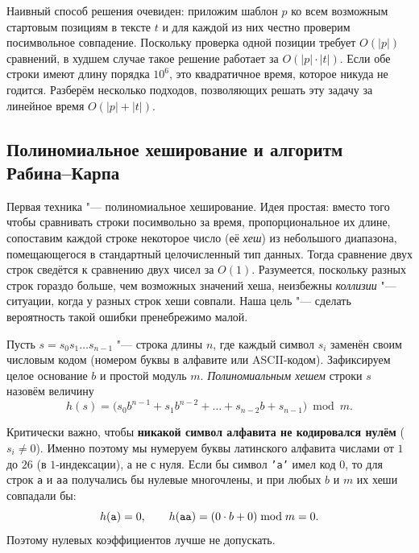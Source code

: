 Наивный способ решения очевиден: приложим шаблон $p$ ко всем возможным стартовым позициям в тексте $t$ и для каждой из них честно проверим посимвольное совпадение. Поскольку проверка одной позиции требует $O(|p|)$ сравнений, в худшем случае такое решение работает за $O(|p| \cdot |t|)$. Если обе строки имеют длину порядка $10^6$, это квадратичное время, которое никуда не годится. Разберём несколько подходов, позволяющих решать эту задачу за линейное время $O(|p| + |t|)$.

\subsection{Полиномиальное хеширование и алгоритм Рабина--Карпа}

Первая техника "--- полиномиальное хеширование. Идея простая: вместо того чтобы сравнивать строки посимвольно за время, пропорциональное их длине, сопоставим каждой строке некоторое число (её \textit{хеш}) из небольшого диапазона, помещающегося в стандартный целочисленный тип данных. Тогда сравнение двух строк сведётся к сравнению двух чисел за $O(1)$. Разумеется, поскольку разных строк гораздо больше, чем возможных значений хеша, неизбежны \textit{коллизии} "--- ситуации, когда у разных строк хеши совпали. Наша цель "--- сделать вероятность такой ошибки пренебрежимо малой.

\begin{definition}
    Пусть $s = s_0 s_1 \dots s_{n-1}$ "--- строка длины $n$, где каждый символ $s_i$ заменён своим числовым кодом (номером буквы в алфавите или ASCII-кодом). Зафиксируем целое основание $b$ и простой модуль $m$. \textit{Полиномиальным хешем} строки $s$ назовём величину
    \begin{equation}\label{eq:poly_hash}
        h(s) = \bigl(s_0 b^{n-1} + s_1 b^{n-2} + \dots + s_{n-2} b + s_{n-1}\bigr) \bmod m.
    \end{equation}
\end{definition}

\begin{note}
    Критически важно, чтобы \textbf{никакой символ алфавита не кодировался нулём} ($s_i \ne 0$). Именно поэтому мы нумеруем буквы латинского алфавита числами от $1$ до $26$ (в $1$-индексации), а не с нуля. Если бы символ \texttt{'a'} имел код $0$, то для строк \texttt{a} и \texttt{aa} получались бы нулевые многочлены, и при любых $b$ и $m$ их хеши совпадали бы:
    \[
        h(\text{\texttt{a}}) = 0, \qquad h(\text{\texttt{aa}}) = (0 \cdot b + 0) \bmod m = 0.
    \]
    Поэтому нулевых коэффициентов лучше не допускать.
\end{note}

